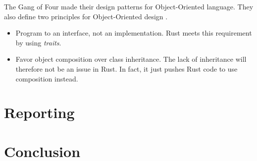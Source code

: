 \documentclass[a4paper,10pt]{article}
\begin{document}
The Gang of Four made their design patterns for Object-Oriented language.
They also define two principles for Object-Oriented design \cite{gamma_94_01}.
\begin{itemize}
  \item Program to an interface, not an implementation.
        Rust meets this requirement by using \textit{traits}.
  \item Favor object composition over class inheritance.
        The lack of inheritance will therefore not be an issue in Rust.
        In fact, it just pushes Rust code to use composition instead.
\end{itemize}





\section{Reporting}

\section{Conclusion}




\end{document}
